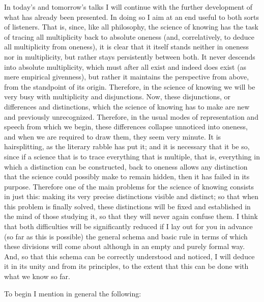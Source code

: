 In today's and tomorrow's talks I will continue
with the further development of
what has already been presented.
In doing so I aim at an end
useful to both sorts of listeners.
That is, since, like all philosophy,
the science of knowing has the task of
tracing all multiplicity back to absolute oneness
(and, correlatively, to deduce all multiplicity from oneness),
it is clear that it itself stands
neither in oneness nor in multiplicity,
but rather stays persistently between both.
It never descends into absolute multiplicity,
which must after all exist and indeed does exist
(as mere empirical givenness),
but rather it maintains the perspective from above,
from the standpoint of its origin.
Therefore, in the science of knowing we will be
very busy with multiplicity and disjunctions.
Now, these disjunctions, or differences and distinctions,
which the science of knowing has to make
are new and previously unrecognized.
Therefore, in the usual modes of representation
and speech from which we begin,
these differences collapse unnoticed into oneness,
and when we are required to draw them,
they seem very minute.
It is hairsplitting, as the literary rabble has put it;
and it is necessary that it be so,
since if a science that is to trace
everything that is multiple, that is,
everything in which a distinction can be constructed,
back to oneness allows any distinction
that the science could possibly make to remain hidden,
then it has failed in its purpose.
Therefore one of the main problems for
the science of knowing consists in just this:
making its very precise distinctions visible and distinct;
so that when this problem is finally solved,
these distinctions will be fixed and established
in the mind of those studying it,
so that they will never again confuse them.
I think that both difficulties
will be significantly reduced
if I lay out for you in advance
(so far as this is possible)
the general schema and basic rule
in terms of which these divisions will come about
although in an empty and purely formal way.
And, so that this schema can be
correctly understood and noticed,
I will deduce it in its unity
and from its principles,
to the extent that this can be done
with what we know so far.

To begin I mention in general the following:

